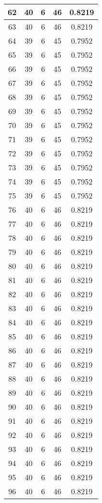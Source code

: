 \documentclass[letterpaper, 12pt]{article}
\begin{document}
\begin{longtable}{|c|c|c|c|c|}
\hline
62 & 40 & 6 & 46 & 0.8219 \\
\hline
63 & 40 & 6 & 46 & 0.8219 \\
\hline
64 & 39 & 6 & 45 & 0.7952 \\
\hline
65 & 39 & 6 & 45 & 0.7952 \\
\hline
66 & 39 & 6 & 45 & 0.7952 \\
\hline
67 & 39 & 6 & 45 & 0.7952 \\
\hline
68 & 39 & 6 & 45 & 0.7952 \\
\hline
69 & 39 & 6 & 45 & 0.7952 \\
\hline
70 & 39 & 6 & 45 & 0.7952 \\
\hline
71 & 39 & 6 & 45 & 0.7952 \\
\hline
72 & 39 & 6 & 45 & 0.7952 \\
\hline
73 & 39 & 6 & 45 & 0.7952 \\
\hline
74 & 39 & 6 & 45 & 0.7952 \\
\hline
75 & 39 & 6 & 45 & 0.7952 \\
\hline
76 & 40 & 6 & 46 & 0.8219 \\
\hline
77 & 40 & 6 & 46 & 0.8219 \\
\hline
78 & 40 & 6 & 46 & 0.8219 \\
\hline
79 & 40 & 6 & 46 & 0.8219 \\
\hline
80 & 40 & 6 & 46 & 0.8219 \\
\hline
81 & 40 & 6 & 46 & 0.8219 \\
\hline
82 & 40 & 6 & 46 & 0.8219 \\
\hline
83 & 40 & 6 & 46 & 0.8219 \\
\hline
84 & 40 & 6 & 46 & 0.8219 \\
\hline
85 & 40 & 6 & 46 & 0.8219 \\
\hline
86 & 40 & 6 & 46 & 0.8219 \\
\hline
87 & 40 & 6 & 46 & 0.8219 \\
\hline
88 & 40 & 6 & 46 & 0.8219 \\
\hline
89 & 40 & 6 & 46 & 0.8219 \\
\hline
90 & 40 & 6 & 46 & 0.8219 \\
\hline
91 & 40 & 6 & 46 & 0.8219 \\
\hline
92 & 40 & 6 & 46 & 0.8219 \\
\hline
93 & 40 & 6 & 46 & 0.8219 \\
\hline
94 & 40 & 6 & 46 & 0.8219 \\
\hline
95 & 40 & 6 & 46 & 0.8219 \\
\hline
96 & 40 & 6 & 46 & 0.8219 \\

\end{longtable}
\end{document}
